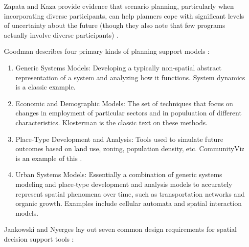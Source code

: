 Zapata and Kaza provide evidence that scenario planning, particularly when incorporating diverse participants, can help planners cope with significant levels of uncertainty about the future (though they also note that few programs actually involve diverse participants) \cite{zapataRadicalUncertaintyScenario2015}.

Goodman describes four primary kinds of planning support models \cite{goodspeedScenarioPlanningCities2020}: 

\begin{enumerate}[itemsep=0pt,parsep=0pt]
	\item{Generic Systems Models: Developing a typically non-spatial abstract representation of a system and analyzing how it functions. System dynamics is a classic example.}
	\item{Economic and Demographic Models: The set of techniques that focus on changes in employment of particular sectors and in populuation of different characteristics. Klosterman is the classic text on these methods. \cite{klostermanCommunityAnalysisPlanning1990}}
	\item{Place-Type Development and Analysis: Tools used to simulate future outcomes based on land use, zoning, population density, etc. CommunityViz is an example of this \cite{walkerPlannersGuideCommunityViz2017}.}
	\item{Urban Systems Models: Essentially a combination of generic systems modeling and place-type development and analysis models to accurately represent spatial phenomena over time, such as transportation networks and organic growth. Examples include cellular automata and spatial interaction models.}
\end{enumerate}


Jankowski and Nyerges lay out seven common design requirements for spatial decision support tools \cite{jankowskiGISGroupDecision2001}:


